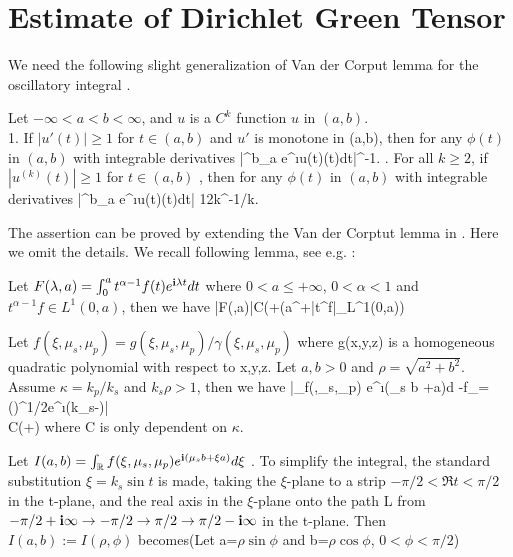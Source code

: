 \documentclass[12pt]{iopart}
\begin{document}
\section{Estimate of Dirichlet Green Tensor}
We need the following slight generalization of Van der Corput lemma for the oscillatory integral \cite[P.152]{grafakos}.
\begin{lem}\label{van}
	Let $-\infty<a<b<\infty$, and $u$ is a $C^k$ function $u$ in $(a,b)$. \\
 1. If $|u'(t)|\ge 1$ for $t\in (a,b)$ and $u'$ is monotone in (a,b), then for any $\phi(t)$ in $(a,b)$ with integrable derivatives
	\ben
	\left|\int^b_a e^{\i\lambda u(t)}\phi(t)dt\right|\lambda^{-1}.
	. For all $k\geq2$, if $|u^{(k)}(t)|\ge 1$ for $t\in (a,b)$ , then for any $\phi(t)$ in $(a,b)$ with integrable derivatives
	\ben
	\left|\int^b_a e^{\i\lambda u(t)}\phi(t)dt\right|\le
	12k\lambda^{-1/k}.
	\een
\end{lem}
\debproof
The assertion can be proved by extending the Van der Corptut lemma in \cite{grafakos}. Here we omit the details.
\finproof
We recall following lemma, see e.g. \cite{Wong_Asymptotic}:
\begin{lem} \label{asym_frac}
	Let $F(\lambda,a)=\int_{0}^{a} t^{\alpha-1}f(t)e^{\mathbf{i}\lambda t}dt$ where $0<a\leq+\infty$, $0<\alpha<1$ and $t^{\alpha-1}f\in L^1(0,a)$, then we have
	\be
	|F(\lambda,a)|\leq C(+(a^{}+|t^{}f|_{L^1(0,a)})
	\ee
\end{lem}
\begin{lem}\label{pr_dgreen}
	Let $f(\xi,\mu_s,\mu_p)=g(\xi,\mu_s,\mu_p)/\gamma(\xi,\mu_s,\mu_p)$ where g(x,y,z) is a homogeneous quadratic polynomial with respect to x,y,z. Let $a,b>0$ and $\rho=\sqrt{a^2+b^2}$. Assume $\kappa=k_p/k_s$ and $k_s\rho >1$, then we have
	\be \label{pr_dgreen1} \nn
	\Big|\int_\R f(\xi,\mu_s,\mu_p) e^{\i(\mu_s b +\xi a)}d\xi
	-f_{\xi=}()^{1/2}e^{\i(k_s\rho-)}\Big|
	\\ \hspace{-0.5cm}
	 \leq C(+)
	\ee
	where C is only dependent on $\kappa$.
\end{lem}
\debproof
Let $I(a,b)=\int_{\mathbb{R}} f(\xi,\mu_s,\mu_p) e^{\mathbf{i}(\mu_s b +\xi a)}d\xi$ . To simplify the integral, the standard substitution $\xi=k_s\sin t$ is made, taking the $\xi$-plane to a strip $-\pi/2<\Re t <\pi/2$ in the t-plane, and the real axis in the $\xi$-plane onto the path L from $-\pi/2+\mathbf{i}\infty\rightarrow-\pi/2\rightarrow\pi/2\rightarrow\pi/2-\mathbf{i}\infty$ in the t-plane. Then $I(a,b):=I(\rho,\phi)$ becomes(Let a=$\rho \sin\phi$  and b=$\rho\cos\phi$, $0<\phi<\pi/2$)
\end{document}
